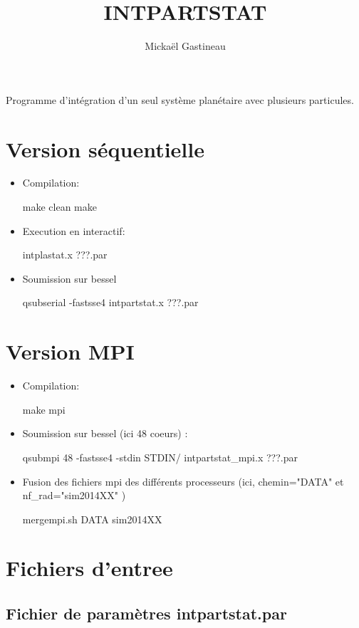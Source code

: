 \documentclass[11pt]{article}
\title{INTPARTSTAT}
\author{Micka\"el Gastineau}
\begin{document}
\maketitle


Programme d'int\'egration d'un seul syst\`eme plan\'etaire avec plusieurs particules.

\section{Version s\'equentielle}

\begin{itemize}
 \item Compilation:  
 
make clean
make
 
\item Execution en interactif: 

intplastat.x  ???.par
\item Soumission sur bessel

qsubserial -fastsse4 intpartstat.x  ???.par
\end{itemize}

\section{Version MPI}

\begin{itemize}
 \item Compilation:  
 
 make mpi
 
\item Soumission sur bessel (ici 48 coeurs) : 

qsubmpi 48 -fastsse4 -stdin STDIN/ intpartstat\_mpi.x  ???.par

\item Fusion des fichiers mpi des diff\'erents processeurs (ici, chemin="DATA" et nf\_rad="sim2014XX" )

mergempi.sh DATA sim2014XX

\end{itemize}



\section{Fichiers d'entree}

\subsection{Fichier de param\`etres  intpartstat.par}
\end{document}
